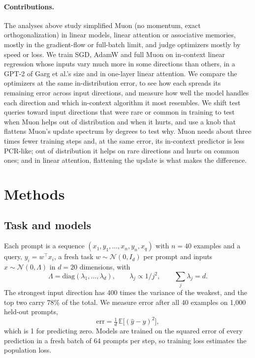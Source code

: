 \documentclass{article}
\newcommand{\E}{\mathbb{E}}
\begin{document}
\paragraph{Contributions.} The analyses above study simplified Muon (no momentum, exact orthogonalization) in linear models, linear attention or associative memories, mostly in the gradient-flow or full-batch limit, and judge optimizers mostly by speed or loss. We train SGD, AdamW and full Muon on in-context linear regression whose inputs vary much more in some directions than others, in a GPT-2 of Garg et al.'s size and in one-layer linear attention. We compare the optimizers at the same in-distribution error, to see how each spreads its remaining error across input directions, and measure how well the model handles each direction and which in-context algorithm it most resembles. We shift test queries toward input directions that were rare or common in training to test when Muon helps out of distribution and when it hurts, and use a knob that flattens Muon's update spectrum by degrees to test why. Muon needs about three times fewer training steps and, at the same error, its in-context predictor is less PCR-like; out of distribution it helps on rare directions and hurts on common ones; and in linear attention, flattening the update is what makes the difference.

\section{Methods}
\label{sec:methods}

\subsection{Task and models}
Each prompt is a sequence $(x_1, y_1, \dots, x_n, y_n, x_q)$ with $n = 40$ examples and a query, $y_i = w^\top x_i$, a fresh task $w \sim \mathcal N(0, I_d)$ per prompt and inputs $x \sim \mathcal N(0, \Lambda)$ in $d = 20$ dimensions, with
\begin{equation}
\Lambda = \mathrm{diag}(\lambda_1,\dots,\lambda_d), \qquad \lambda_j \propto 1/j^2, \qquad \textstyle\sum_j \lambda_j = d .
\end{equation}
The strongest input direction has 400 times the variance of the weakest, and the top two carry 78\% of the total. We measure error after all 40 examples on 1,000 held-out prompts,
\begin{equation}
\mathrm{err} = \tfrac{1}{d}\,\E\big[(\hat y - y)^2\big],
\label{eq:err}
\end{equation}
which is 1 for predicting zero. Models are trained on the squared error of every prediction in a fresh batch of 64 prompts per step, so training loss estimates the population loss.
\end{document}
